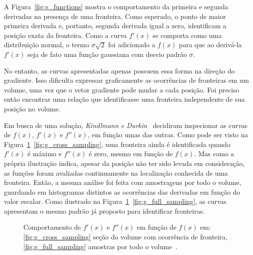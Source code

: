 	A Figura~\ref{fig:g_functions} mostra o comportamento da primeira e segunda derivadas na presença de uma fronteira. Como esperado, o ponto de maior primeira derivada e, portanto, segunda derivada igual a zero, identificam a posição exata da fronteira. Como a curva $f'(x)$ se comporta como uma distribuição normal, o termo $ \sigma\sqrt{2} $ foi adicionado a $ f(x) $ para que ao derivá-la $ f'(x) $ seja de fato uma função gaussiana com desvio padrão $ \sigma $.
	
	No entanto, as curvas apresentadas apenas possuem essa forma na direção do gradiente. Isso dificulta expressar graficamente as ocorrências de fronteiras em um volume, uma vez que o vetor gradiente pode mudar a cada posição. Foi preciso então encontrar uma relação que identificasse uma fronteira independente de sua posição no volume.
	
	Em busca de uma solução, \textit{Kindlmann e Durkin}~\cite{gordon} decidiram inspecionar as curvas de $ f(x) $, $ f'(x) $ e $ f''(x) $, em função umas das outras. Como pode ser visto na Figura~\ref{fig:g_sampling}~\ref{fig:g_cross_sampling}, uma fronteira ainda é identificada quando $ f'(x) $ é máximo e $ f''(x) $ é zero, mesmo em função de $ f(x) $. Mas como a própria ilustração indica, apesar da posição não ter sido levada em consideração, as funções foram avaliadas continuamente na localização conhecida de uma fronteira. Então, a mesma análise foi feita com amostragens por todo o volume, guardando em histogramas distintos as ocorrências das derivadas em função do valor escalar. Como ilustrado na Figura~\ref{fig:g_sampling}~\ref{fig:g_full_sampling}, as curvas apresentam o mesmo padrão já proposto para identificar fronteiras.
	
\begin{figure}[t]
	\centering
	\caption{Comportamento de $ f'(x) $ e $ f''(x) $ em função de $ f(x) $ em: \ref{fig:g_cross_sampling} seção do volume com ocorrência de fronteira, \ref{fig:g_full_sampling} amostras por todo o volume~\cite{gordon}.}
	\label{fig:g_sampling}
\end{figure}

